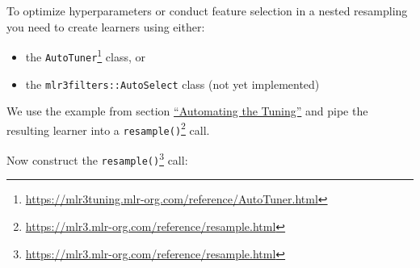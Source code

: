 \documentclass[12pt,]{scrbook}
\newenvironment{Shaded}{}{}
\newcommand{\DataTypeTok}[1]{#1}
\newcommand{\DecValTok}[1]{#1}
\newcommand{\FloatTok}[1]{#1}
\newcommand{\KeywordTok}[1]{\textcolor[rgb]{0.00,0.00,1.00}{#1}}
\newcommand{\NormalTok}[1]{#1}
\newcommand{\OperatorTok}[1]{#1}
\newcommand{\StringTok}[1]{\textcolor[rgb]{0.00,0.50,0.50}{#1}}
\providecommand{\tightlist}{%
  \setlength{\itemsep}{0pt}\setlength{\parskip}{0pt}}
\renewcommand{\href}[2]{#2\footnote{\url{#1}}}
\begin{document}
To optimize hyperparameters or conduct feature selection in a nested resampling you need to create learners using either:

\begin{itemize}
\tightlist
\item
  the \href{https://mlr3tuning.mlr-org.com/reference/AutoTuner.html}{\texttt{AutoTuner}} class, or
\item
  the \texttt{mlr3filters::AutoSelect} class (not yet implemented)
\end{itemize}

We use the example from section \protect\hyperlink{autotuner}{``Automating the Tuning''} and pipe the resulting learner into a \href{https://mlr3.mlr-org.com/reference/resample.html}{\texttt{resample()}} call.

\begin{Shaded}
\end{Shaded}

Now construct the \href{https://mlr3.mlr-org.com/reference/resample.html}{\texttt{resample()}} call:
\end{document}
